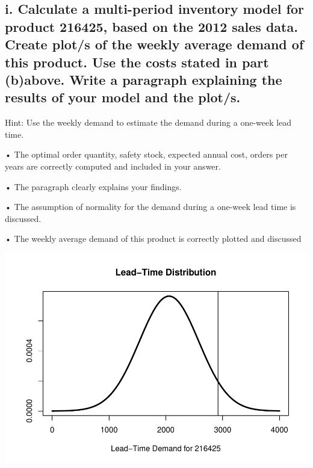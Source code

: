 \documentclass[
  11pt,
]{article}
\begin{document}
\hypertarget{i.-calculate-a-multi-period-inventory-model-for-product-216425-based-on-the-2012-sales-data.-create-plots-of-the-weekly-average-demand-of-this-product.-use-the-costs-stated-in-part-babove.-write-a-paragraph-explaining-the-results-of-your-model-and-the-plots.}{%
\subsection{i. Calculate a multi-period inventory model for product
216425, based on the 2012 sales data. Create plot/s of the weekly
average demand of this product. Use the costs stated in part (b)above.
Write a paragraph explaining the results of your model and the
plot/s.}\label{i.-calculate-a-multi-period-inventory-model-for-product-216425-based-on-the-2012-sales-data.-create-plots-of-the-weekly-average-demand-of-this-product.-use-the-costs-stated-in-part-babove.-write-a-paragraph-explaining-the-results-of-your-model-and-the-plots.}}

Hint: Use the weekly demand to estimate the demand during a one-week
lead time.

• The optimal order quantity, safety stock, expected annual cost, orders
per years are correctly computed and included in your answer.

• The paragraph clearly explains your findings.

• The assumption of normality for the demand during a one-week lead time
is discussed.

• The weekly average demand of this product is correctly plotted and
discussed

\includegraphics{Assignment-STAT702_files/figure-latex/2bi-1.pdf}
\end{document}
